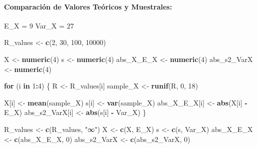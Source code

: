 \documentclass[
]{article}
\newenvironment{Shaded}{\begin{snugshade}}{\end{snugshade}}
\newcommand{\ControlFlowTok}[1]{\textcolor[rgb]{0.13,0.29,0.53}{\textbf{#1}}}
\newcommand{\DecValTok}[1]{\textcolor[rgb]{0.00,0.00,0.81}{#1}}
\newcommand{\FunctionTok}[1]{\textcolor[rgb]{0.13,0.29,0.53}{\textbf{#1}}}
\newcommand{\NormalTok}[1]{#1}
\newcommand{\OtherTok}[1]{\textcolor[rgb]{0.56,0.35,0.01}{#1}}
\newcommand{\SpecialCharTok}[1]{\textcolor[rgb]{0.81,0.36,0.00}{\textbf{#1}}}
\newcommand{\StringTok}[1]{\textcolor[rgb]{0.31,0.60,0.02}{#1}}
\begin{document}
\paragraph{Comparación de Valores Teóricos y
Muestrales:}\label{comparaciuxf3n-de-valores-teuxf3ricos-y-muestrales}

\begin{Shaded}
\begin{Highlighting}[]
\NormalTok{E\_X }\OtherTok{=} \DecValTok{9}
\NormalTok{Var\_X }\OtherTok{=} \DecValTok{27}

\NormalTok{R\_values }\OtherTok{\textless{}{-}} \FunctionTok{c}\NormalTok{(}\DecValTok{2}\NormalTok{, }\DecValTok{30}\NormalTok{, }\DecValTok{100}\NormalTok{, }\DecValTok{10000}\NormalTok{)}

\NormalTok{X }\OtherTok{\textless{}{-}} \FunctionTok{numeric}\NormalTok{(}\DecValTok{4}\NormalTok{)}
\NormalTok{s }\OtherTok{\textless{}{-}} \FunctionTok{numeric}\NormalTok{(}\DecValTok{4}\NormalTok{)}
\NormalTok{abs\_X\_E\_X }\OtherTok{\textless{}{-}} \FunctionTok{numeric}\NormalTok{(}\DecValTok{4}\NormalTok{)}
\NormalTok{abs\_s2\_VarX }\OtherTok{\textless{}{-}} \FunctionTok{numeric}\NormalTok{(}\DecValTok{4}\NormalTok{)}

\ControlFlowTok{for}\NormalTok{ (i }\ControlFlowTok{in} \DecValTok{1}\SpecialCharTok{:}\DecValTok{4}\NormalTok{) \{}
\NormalTok{  R }\OtherTok{\textless{}{-}}\NormalTok{ R\_values[i]}
\NormalTok{  sample\_X }\OtherTok{\textless{}{-}} \FunctionTok{runif}\NormalTok{(R, }\DecValTok{0}\NormalTok{, }\DecValTok{18}\NormalTok{)}
  
\NormalTok{  X[i] }\OtherTok{\textless{}{-}} \FunctionTok{mean}\NormalTok{(sample\_X)}
\NormalTok{  s[i] }\OtherTok{\textless{}{-}} \FunctionTok{var}\NormalTok{(sample\_X)}
\NormalTok{  abs\_X\_E\_X[i] }\OtherTok{\textless{}{-}} \FunctionTok{abs}\NormalTok{(X[i] }\SpecialCharTok{{-}}\NormalTok{ E\_X)}
\NormalTok{  abs\_s2\_VarX[i] }\OtherTok{\textless{}{-}} \FunctionTok{abs}\NormalTok{(s[i] }\SpecialCharTok{{-}}\NormalTok{ Var\_X)}
\NormalTok{\}}

\NormalTok{R\_values }\OtherTok{\textless{}{-}} \FunctionTok{c}\NormalTok{(R\_values, }\StringTok{"∞"}\NormalTok{)}
\NormalTok{X }\OtherTok{\textless{}{-}} \FunctionTok{c}\NormalTok{(X, E\_X)}
\NormalTok{s }\OtherTok{\textless{}{-}} \FunctionTok{c}\NormalTok{(s, Var\_X)}
\NormalTok{abs\_X\_E\_X }\OtherTok{\textless{}{-}} \FunctionTok{c}\NormalTok{(abs\_X\_E\_X, }\DecValTok{0}\NormalTok{)}
\NormalTok{abs\_s2\_VarX }\OtherTok{\textless{}{-}} \FunctionTok{c}\NormalTok{(abs\_s2\_VarX, }\DecValTok{0}\NormalTok{)}


\end{Highlighting}
\end{Shaded}
\end{document}

